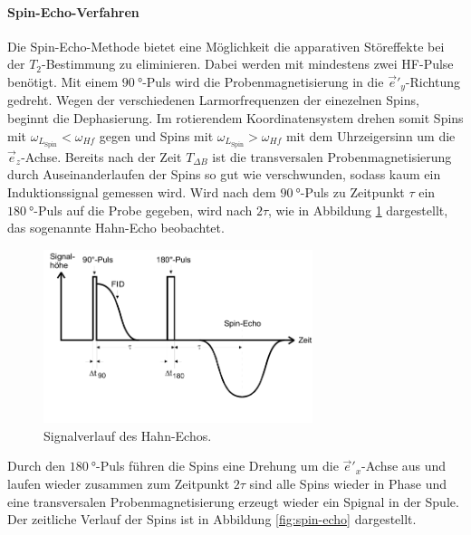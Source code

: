 \paragraph{Spin-Echo-Verfahren}
Die Spin-Echo-Methode bietet eine Möglichkeit die apparativen Störeffekte
bei der $T_2$-Bestimmung zu eliminieren.
Dabei werden mit mindestens zwei HF-Pulse benötigt.
Mit einem $\SI{90}{\degree}$-Puls wird die Probenmagnetisierung in die
$\vec{e}'_y$-Richtung gedreht.
Wegen der verschiedenen Larmorfrequenzen der einezelnen Spins, beginnt die Dephasierung.
Im rotierendem Koordinatensystem drehen somit Spins mit $\omega_{L_\text{Spin}}<\omega_{Hf}$
gegen und Spins mit $\omega_{L_\text{Spin}}>\omega_{Hf}$ mit dem
Uhrzeigersinn um die $\vec{e}_z$-Achse.
Bereits nach der Zeit $T_{\Delta B}$ ist die transversalen
Probenmagnetisierung durch
Auseinanderlaufen der Spins so gut wie verschwunden,
sodass kaum ein Induktionssignal
gemessen wird. Wird nach dem $\SI{90}{\degree}$-Puls
zu Zeitpunkt $\tau$
ein $\SI{180}{\degree}$-Puls
auf die Probe gegeben, wird nach $2\tau$,
wie in Abbildung \ref{fig:hahn-echo} dargestellt,
das sogenannte Hahn-Echo beobachtet.
\begin{figure}
  \centering
  \includegraphics[width=0.7\textwidth]{hahn-echo.PNG}
  \caption{Signalverlauf des Hahn-Echos.\cite{sample}}
  \label{fig:hahn-echo}
\end{figure}
Durch den $\SI{180}{\degree}$-Puls führen
die Spins eine Drehung um die
$\vec{e}'_x$-Achse aus und laufen wieder zusammen
zum Zeitpunkt $2\tau$ sind alle Spins wieder in Phase und eine
transversalen Probenmagnetisierung
erzeugt wieder ein Spignal in der Spule.
Der zeitliche Verlauf der Spins ist in Abbildung
\ref{fig:spin-echo} dargestellt.
\FloatBarrier
